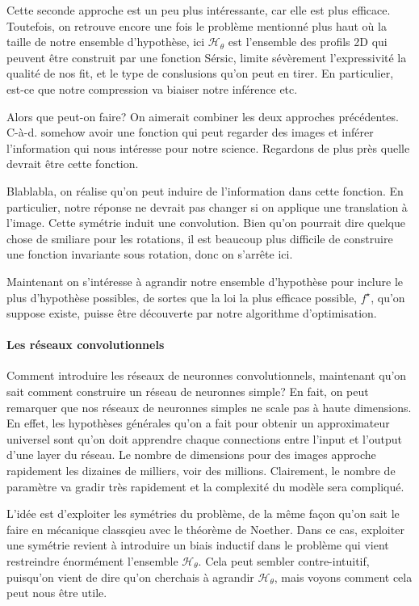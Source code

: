Cette seconde approche est un peu plus intéressante, car elle est plus efficace. Toutefois, on retrouve encore une fois le problème mentionné plus 
haut où la taille de notre ensemble d'hypothèse, ici $\mathcal{H}_\theta$ est l'ensemble des profils 2D qui peuvent être construit par une fonction Sérsic, 
limite sévèrement l'expressivité la qualité de nos fit, et le type de conslusions qu'on peut en tirer. En particulier, est-ce que notre compression va 
biaiser notre inférence etc.

Alors que peut-on faire? On aimerait combiner les deux approches précédentes. C-à-d. somehow avoir une fonction qui peut regarder des images et 
inférer l'information qui nous intéresse pour notre science. Regardons de plus près quelle devrait être cette fonction. 

Blablabla, on réalise qu'on peut induire de l'information dans cette fonction. En particulier, notre réponse ne devrait pas changer si on 
applique une translation à l'image. Cette symétrie induit une convolution. Bien qu'on pourrait dire quelque chose de smiliare pour les rotations, 
il est beaucoup plus difficile de construire une fonction invariante sous rotation, donc on s'arrête ici. 

Maintenant on s'intéresse à agrandir notre ensemble d'hypothèse pour inclure le plus d'hypothèse possibles, de sortes que la loi la plus efficace possible, $f^{\star}$, 
qu'on suppose existe, puisse être découverte par notre algorithme d'optimisation.
\paragraph{Les réseaux convolutionnels}
Comment introduire les réseaux de neuronnes convolutionnels, maintenant qu'on sait comment construire un réseau de neuronnes simple? 
En fait, on peut remarquer que nos réseaux de neuronnes simples ne scale pas à haute dimensions. En effet, les hypothèses générales qu'on a fait 
pour obtenir un approximateur universel sont qu'on doit apprendre chaque connections entre l'input et l'output d'une layer du réseau. Le nombre de 
dimensions pour des images approche rapidement les dizaines de milliers, voir des millions. Clairement, le nombre de paramètre va gradir très rapidement et 
la complexité du modèle sera compliqué. 

L'idée est d'exploiter les symétries du problème, de la même façon qu'on sait le faire en mécanique classqieu avec le théorème de Noether. 
Dans ce cas, exploiter une symétrie revient à introduire un biais inductif dans le problème qui vient restreindre énormément l'ensemble $\mathcal{H}_\theta$. 
Cela peut sembler contre-intuitif, puisqu'on vient de dire qu'on cherchais à agrandir $\mathcal{H}_\theta$, mais voyons comment cela peut nous être utile. 

